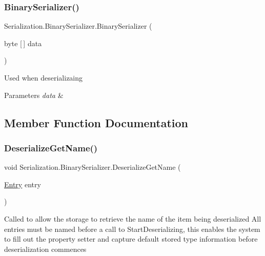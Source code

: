 \subsubsection{\texorpdfstring{Binary\+Serializer()}{BinarySerializer()}\hspace{0.1cm}{\footnotesize\ttfamily [2/2]}}
{\footnotesize\ttfamily Serialization.\+Binary\+Serializer.\+Binary\+Serializer (\begin{DoxyParamCaption}\item[{byte \mbox{[}$\,$\mbox{]}}]{data }\end{DoxyParamCaption})\hspace{0.3cm}{\ttfamily [inline]}}



Used when deserializaing 


\begin{DoxyParams}{Parameters}
{\em data} & \\
\hline
\end{DoxyParams}


\subsection{Member Function Documentation}
\mbox{\label{class_serialization_1_1_binary_serializer_ac02802eda1961199b7e91adce7c33de7}} 
\subsubsection{\texorpdfstring{Deserialize\+Get\+Name()}{DeserializeGetName()}}
{\footnotesize\ttfamily void Serialization.\+Binary\+Serializer.\+Deserialize\+Get\+Name (\begin{DoxyParamCaption}\item[{\hyperlink{class_serialization_1_1_entry}{Entry}}]{entry }\end{DoxyParamCaption})\hspace{0.3cm}{\ttfamily [inline]}}



Called to allow the storage to retrieve the name of the item being deserialized All entries must be named before a call to Start\+Deserializing, this enables the system to fill out the property setter and capture default stored type information before deserialization commences 


